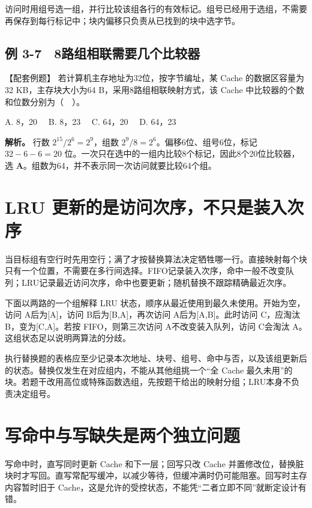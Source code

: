 访问时用组号选一组，并行比较该组各行的有效标记。组号已经用于选组，不需要再保存到每行标记中；块内偏移只负责从已找到的块中选字节。

\subsection{例 3-7　8路组相联需要几个比较器}\label{CO03-18}

\begin{example}[配套例题]

【配套例题】 若计算机主存地址为32位，按字节编址，某 Cache 的数据区容量为32 KB，主存块大小为64 B，采用8路组相联映射方式，该 Cache 中比较器的个数和位数分别为（　）。

A. 8，20　 B. 8，23　 C. 64，20　 D. 64，23

\end{example}

\textbf{解析。} 行数 \(2^{15}/2^6=2^9\)，组数 \(2^9/8=2^6\)。偏移6位、组号6位，标记 \(32-6-6=20\) 位。一次只在选中的一组内比较8个标记，因此8个20位比较器，选 \textbf{A}。组数为64，并不表示同一次访问就要比较64个组。

\section{LRU 更新的是访问次序，不只是装入次序}\label{CO03-19}

当目标组有空行时先用空行；满了才按替换算法决定牺牲哪一行。直接映射每个块只有一个位置，不需要在多行间选择。FIFO记录装入次序，命中一般不改变队列；LRU记录最近访问次序，命中也要更新；随机替换不跟踪精确最近次序。

下面以两路的一个组解释 LRU 状态，顺序从最近使用到最久未使用。开始为空，访问 A后为{[}A{]}，访问 B后为{[}B,A{]}，再次访问 A后为{[}A,B{]}。此时访问 C，应淘汰 B，变为{[}C,A{]}。若按 FIFO，则第三次访问 A不改变装入队列，访问 C会淘汰 A。这组状态足以说明两算法的分歧。

执行替换题的表格应至少记录本次地址、块号、组号、命中与否，以及该组更新后的状态。替换仅发生在对应组内，不能从其他组挑一个``全 Cache 最久未用''的块。若题干改用高位或特殊函数选组，先按题干给出的映射分组；LRU本身不负责决定组号。

\section{写命中与写缺失是两个独立问题}\label{CO03-20}

写命中时，直写同时更新 Cache 和下一层；回写只改 Cache 并置修改位，替换脏块时才写回。直写常配写缓冲，以减少等待，但缓冲满时仍可能阻塞。回写时主存内容暂时旧于 Cache，这是允许的受控状态，不能凭``二者立即不同''就断定设计有错。

